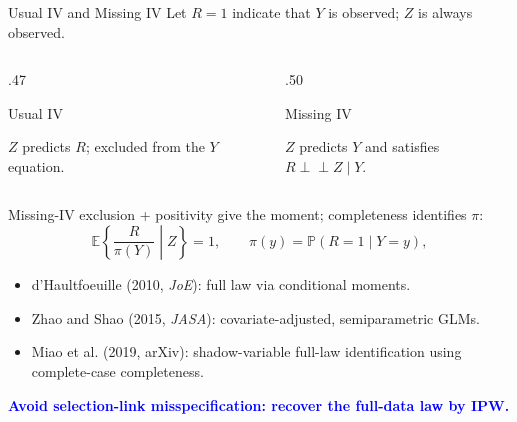 \documentclass[aspectratio=169,10pt]{beamer}
\newcommand{\slidebody}{\fontsize{10.6pt}{12.6pt}\selectfont}
\renewcommand{\footnotesize}{\slidebody}
\newcommand{\E}{\mathbb E}
\newcommand{\Prb}{\mathbb P}
\newcommand{\indep}{\mathrel{\perp\!\!\!\perp}}
\newcommand{\bluekey}[1]{\textcolor{Blue}{\textbf{#1}}}
\begin{document}
\begin{frame}{Usual IV and Missing IV}
Let $R=1$ indicate that $Y$ is observed; $Z$ is always observed.
\begin{columns}[T,onlytextwidth]
\begin{column}{.47\textwidth}
\begin{block}{Usual IV}
\centering
{}
\par
$Z$ predicts $R$; excluded from the $Y$ equation.
\end{block}
\end{column}
\begin{column}{.50\textwidth}
\begin{block}{Missing IV}
\centering
{}
\par
$Z$ predicts $Y$ and satisfies $R\indep Z\mid Y$.
\end{block}
\end{column}
\end{columns}
Missing-IV exclusion + positivity give the moment; completeness identifies $\pi$:
\setlength{\abovedisplayskip}{2pt}
\setlength{\belowdisplayskip}{0pt}
\[
\E\left\{\frac{R}{\pi(Y)}\middle|Z\right\}=1,
\qquad \pi(y)=\Prb(R=1\mid Y=y),
\]
{\footnotesize
\begin{itemize}
\setlength{\itemsep}{0pt}
\item d'Haultfoeuille (2010, \emph{JoE}): full law via conditional moments.
\item Zhao and Shao (2015, \emph{JASA}): covariate-adjusted, semiparametric GLMs.
\item Miao et al. (2019, arXiv): shadow-variable full-law identification using complete-case completeness.
\end{itemize}
}
\par
\bluekey{Avoid selection-link misspecification: recover the full-data law by IPW.}
\end{frame}
\end{document}
